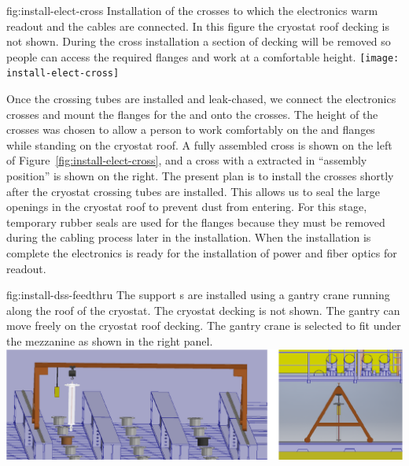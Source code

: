 \begin{dunefigure}{fig:install-elect-cross}
  {Installation of the crosses to which the  electronics warm readout and the  cables are connected. In this figure the cryostat roof decking is not shown. During the cross installation a section of decking will be removed so people can access the required flanges and work at a comfortable height.  }
 \texttt{[image: install-elect-cross]}
\end{dunefigure}



Once the crossing tubes are installed and leak-chased, we connect the   electronics crosses and mount  the  \fdth flanges for the  and  onto the crosses. 
The height of the crosses was chosen to allow a person to work comfortably on the   and  flanges while standing on the cryostat roof. 
A fully assembled cross is shown on the left of Figure~\ref{fig:install-elect-cross}, and a cross with a  extracted in ``assembly position'' is shown on the right. 
The present plan is to install the crosses shortly after the cryostat crossing tubes are installed. 
This allows us to seal the large openings in the cryostat roof to prevent dust from entering.
For this stage, temporary rubber seals are used for the flanges because they must be removed during the cabling process later in the installation. 
When the  installation is complete the  electronics is ready for the installation of power and fiber optics for readout. 

\begin{dunefigure}{fig:install-dss-feedthru}
  {The  support \fdth{}s  are installed using a gantry crane running along the roof of the cryostat.
  The cryostat decking is not shown. 
  The gantry can move freely on the cryostat roof decking. The gantry crane is selected to fit under the mezzanine as shown in the right panel.
  }
  \includegraphics[width=.98\textwidth]{graphics/install-dss-feedthru-v2.pdf}
\end{dunefigure}


